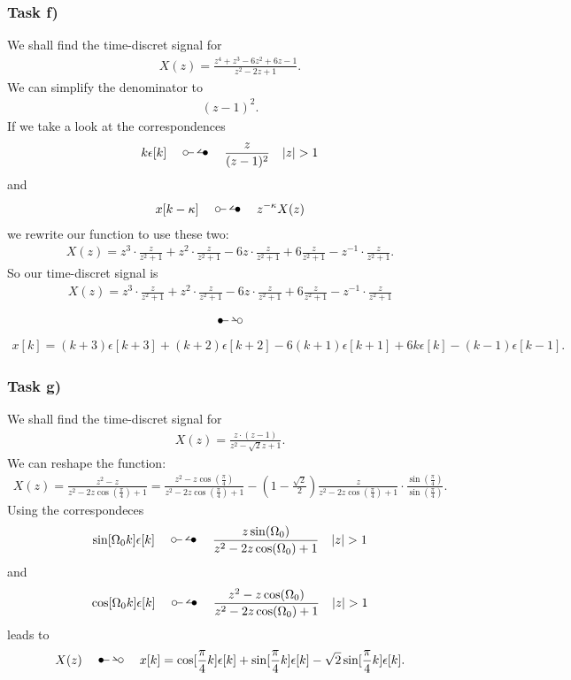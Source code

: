 \subsubsection{Task f)}
We shall find the time-discret signal for
\begin{align}
	X(z)=\frac{z^4+z^3-6z^2+6z-1}{z^2-2z+1}.
\end{align}
We can simplify the denominator to
\begin{align}
	(z-1)^2.
\end{align}
If we take a look at the correspondences
\begin{align}
	k\epsilon[k]\quad\ztransf\quad\frac{z}{(z-1)^2}\quad |z|>1
\end{align}
and
\begin{align}
	x[k-\kappa]\quad\ztransf\quad z^{-\kappa}X(z)
\end{align}
we rewrite our function to use these two:
\begin{align}
	X(z)=z^3\cdot\frac{z}{z^2+1}+z^2\cdot\frac{z}{z^2+1}-6z\cdot\frac{z}{z^2+1}+6\frac{z}{z^2+1}-z^{-1}\cdot\frac{z}{z^2+1}.
\end{align}
So our time-discret signal is
\begin{align}
	X(z)=z^3\cdot\frac{z}{z^2+1}+z^2\cdot\frac{z}{z^2+1}-6z\cdot\frac{z}{z^2+1}+6\frac{z}{z^2+1}-z^{-1}\cdot\frac{z}{z^2+1} \nonumber
\end{align}
\begin{align}
	\Ztransf \nonumber
\end{align}
\begin{align}
	x[k]=(k+3)\epsilon[k+3]+(k+2)\epsilon[k+2]-6(k+1)\epsilon[k+1]+6k\epsilon[k]-(k-1)\epsilon[k-1].
\end{align}
\subsubsection{Task g)}
We shall find the time-discret signal for
\begin{align}
	X(z)=\frac{z\cdot(z-1)}{z^2-\sqrt{2}z+1}.
\end{align}
We can reshape the function:
\begin{align}
	X(z)=\frac{z^2-z}{z^2-2z\cos(\frac{\pi}{4})+1}=\frac{z^2-z\cos(\frac{\pi}{4})}{z^2-2z\cos(\frac{\pi}{4})+1}-(1-\frac{\sqrt{2}}{2})\frac{z}{z^2-2z\cos(\frac{\pi}{4})+1}\cdot\frac{\sin(\frac{\pi}{4})}{\sin(\frac{\pi}{4})}.
\end{align}
Using the correspondeces
\begin{align}
	\sin[\Omega_0k]\epsilon[k]\quad\ztransf\quad\frac{z\sin(\Omega_0)}{z^2-2z\cos(\Omega_0)+1}\quad |z| > 1
\end{align}
and
\begin{align}
	\cos[\Omega_0k]\epsilon[k]\quad\ztransf\quad\frac{z^2-z\cos(\Omega_0)}{z^2-2z\cos(\Omega_0)+1}\quad |z| > 1
\end{align}
leads to
\begin{align}
	X(z)\quad\Ztransf\quad x[k]=\cos[\frac{\pi}{4}k]\epsilon[k]+\sin[\frac{\pi}{4}k]\epsilon[k]-\sqrt{2}\sin[\frac{\pi}{4}k]\epsilon[k].
\end{align}
